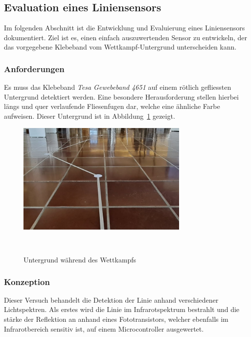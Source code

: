 \documentclass{article}
\begin{document}

\subsection{Evaluation eines Liniensensors}

Im folgenden Abschnitt ist die Entwicklung und Evaluierung eines Liniensensors
dokumentiert. Ziel ist es, einen einfach auszuwertenden Sensor zu entwickeln,
der das vorgegebene Klebeband vom Wettkampf-Untergrund unterscheiden kann.

\subsubsection{Anforderungen}
Es muss das Klebeband \textit{Tesa Gewebeband 4651} auf einem rötlich
gefliessten Untergrund detektiert werden. Eine besondere Herausforderung
stellen hierbei längs und quer verlaufende Fliesenfugen dar, welche eine
ähnliche Farbe aufweisen. Dieser Untergrund ist in
Abbildung~\ref{fig:Untergrund_Wettkampf} gezeigt.

\begin{figure}[H]
    \centering
    \includegraphics[width=0.75\textwidth]{Bild_Untergrund.jpg}
    \caption{Untergrund während des Wettkampfs}~\label{fig:Untergrund_Wettkampf}
\end{figure}

\subsubsection{Konzeption}
Dieser Versuch behandelt die Detektion der Linie anhand verschiedener
Lichtspektren. Als erstes wird die Linie im Infrarotspektrum bestrahlt und die
stärke der Reflektion an anhand eines Fototransistors, welcher ebenfalls im
Infrarotbereich sensitiv ist, auf einem Microcontroller ausgewertet. \
\end{document}
